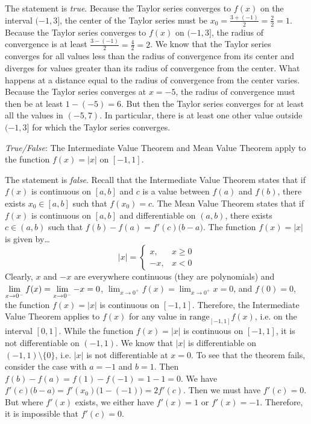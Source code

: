 \documentclass[11pt,letterpaper]{article}
\begin{document}
\sol The statement is \textit{true}. Because the Taylor series converges to $f(x)$ on the interval $(-1, 3]$, the center of the Taylor series must be $x_0= \frac{3 + (-1)}{2}= \frac{2}{2}= 1$. Because the Taylor series converges to $f(x)$ on $(-1, 3]$, the radius of convergence is at least $\frac{3 - (-1)}{2}= \frac{4}{2}= 2$. We know that the Taylor series converges for all values less than the radius of convergence from its center and diverges for values greater than its radius of convergence from the center. What happens at a distance equal to the radius of convergence from the center varies. Because the Taylor series converges at $x= -5$, the radius of convergence must then be at least $1 - (-5)= 6$. But then the Taylor series converges for at least all the values in $(-5, 7)$. In particular, there is at least one other value outside $(-1, 3]$ for which the Taylor series converges. \pvspace{1.3cm}





\newpage





\quizsol \textit{True/False}: The Intermediate Value Theorem and Mean Value Theorem apply to the function $f(x)= |x|$ on $[-1, 1]$. \pspace

\sol The statement is \textit{false}. Recall that the Intermediate Value Theorem states that if $f(x)$ is continuous on $[a, b]$ and $c$ is a value between $f(a)$ and $f(b)$, there exists $x_0 \in [a, b]$ such that $f(x_0)= c$. The Mean Value Theorem states that if $f(x)$ is continuous on $[a, b]$ and differentiable on $(a, b)$, there exists $c \in (a, b)$ such that $f(b) - f(a)= f'(c) \big(b - a \big)$. The function $f(x)= |x|$ is given by\dots
	\[
	|x|= 
	\begin{cases}
	x, & x \geq 0 \\
	-x, & x < 0
	\end{cases}
	\]
Clearly, $x$ and $-x$ are everywhere continuous (they are polynomials) and $\displaystyle \lim_{x \to 0^-} f(x)= \lim_{x \to 0^-} -x= 0$, $\lim_{x \to 0^+} f(x)= \lim_{x \to 0^+} x= 0$, and $f(0)= 0$, the function $f(x)= |x|$ is continuous on $[-1, 1]$. Therefore, the Intermediate Value Theorem applies to $f(x)$ for any value in $\text{range}_{[-1,1]} f(x)$, i.e. on the interval $[0, 1]$. While the function $f(x)= |x|$ is continuous on $[-1, 1]$, it is not differentiable on $(-1, 1)$. We know that $|x|$ is differentiable on $(-1, 1) \setminus \{ 0 \}$, i.e. $|x|$ is not differentiable at $x= 0$. To see that the theorem fails, consider the case with $a= -1$ and $b= 1$. Then $f(b) - f(a)= f(1) - f(-1)= 1 - 1= 0$. We have $f'(c) \big(b - a \big)= f'(x_0) \big(1 - (-1) \big)= 2f'(c)$. Then we must have $f'(c)= 0$. But where $f'(x)$ exists, we either have $f'(x)= 1$ or $f'(x)= -1$. Therefore, it is impossible that $f'(c)= 0$. \pvspace{1.3cm}
\end{document}

